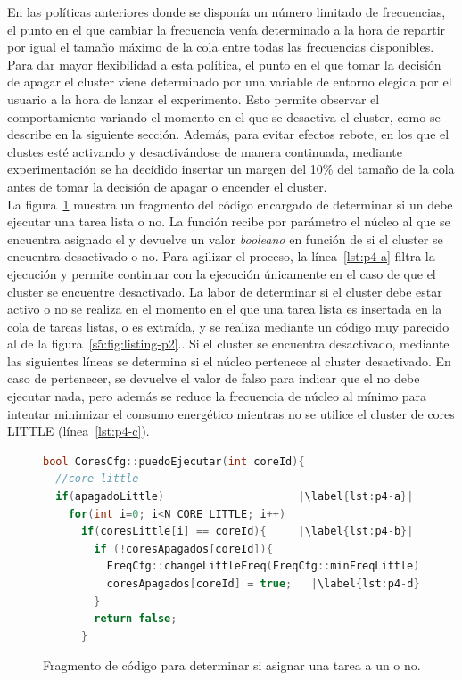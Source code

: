 En las políticas anteriores donde se disponía un número limitado de
frecuencias, el punto en el que cambiar la frecuencia venía determinado a
la hora de repartir por igual el tamaño máximo de la cola entre todas las
frecuencias disponibles. Para dar mayor flexibilidad a esta política, el
punto en el que tomar la decisión de apagar el cluster viene determinado
por una variable de entorno elegida por el usuario a la hora de lanzar el
experimento. Esto permite observar el comportamiento variando el momento en
el que se desactiva el cluster, como se describe en la siguiente
sección. Además, para evitar efectos rebote, en los que el clustes esté
activando y desactivándose de manera continuada, mediante experimentación
se ha decidido insertar un margen del 10\% del tamaño de la cola antes de
tomar la decisión de apagar o encender el cluster.\\

La figura~\ref{fig:P4-puedo-ejecutar} muestra un fragmento del código
encargado de determinar si un \wt debe ejecutar una tarea lista o no. La
función recibe por parámetro el núcleo al que se encuentra asignado el \wt
y devuelve un valor \emph{booleano} en función de si el cluster se
encuentra desactivado o no. Para agilizar el proceso, la
línea~\ref{lst:p4-a} filtra la ejecución y permite continuar con la
ejecución únicamente en el caso de que el cluster se encuentre
desactivado. La labor de determinar si el cluster debe estar activo o no se
realiza en el momento en el que una tarea lista es insertada en la cola de
tareas listas, o es extraída, y se realiza mediante un código muy parecido
al de la figura~\ref{s5:fig:listing-p2}.. Si el cluster se encuentra desactivado, mediante las siguientes
líneas se determina si el núcleo pertenece al cluster desactivado. En caso
de pertenecer, se devuelve el valor de falso para indicar que el \wt no
debe ejecutar nada, pero además se reduce la frecuencia de núcleo al mínimo
para intentar minimizar el consumo energético mientras no se utilice el
cluster de cores LITTLE (línea~\ref{lst:p4-c}).


\begin{figure}
  \centering
\begin{lstlisting}[language=C++]
bool CoresCfg::puedoEjecutar(int coreId){
  //core little
  if(apagadoLittle)                     |\label{lst:p4-a}|
    for(int i=0; i<N_CORE_LITTLE; i++)
      if(coresLittle[i] == coreId){     |\label{lst:p4-b}|
        if (!coresApagados[coreId]){
          FreqCfg::changeLittleFreq(FreqCfg::minFreqLittle); |\label{lst:p4-c}|
          coresApagados[coreId] = true;   |\label{lst:p4-d}|
        }
        return false;
      }
\end{lstlisting}
  \caption{Fragmento de código para determinar si asignar una tarea a un
    \wt o no.}
  \label{fig:P4-puedo-ejecutar}
\end{figure}

